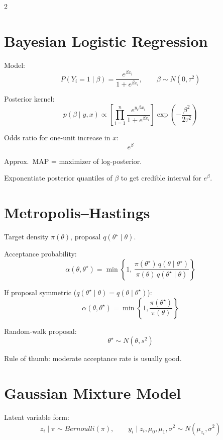 \documentclass[10pt]{article}
\begin{document}
\begin{multicols}{2}
\section{Bayesian Logistic Regression}

Model:
\[
P(Y_i=1\mid \beta)=\frac{e^{\beta x_i}}{1+e^{\beta x_i}},
\qquad
\beta\sim N(0,\tau^2)
\]

\begin{formulabox}
Posterior kernel:
\[
p(\beta\mid y,x)\propto
\left[
\prod_{i=1}^n
\frac{e^{y_i\beta x_i}}{1+e^{\beta x_i}}
\right]
\exp\left(-\frac{\beta^2}{2\tau^2}\right)
\]
\end{formulabox}

Odds ratio for one-unit increase in \(x\):
\[
e^\beta
\]

Approx.\ MAP = maximizer of log-posterior.

Exponentiate posterior quantiles of \(\beta\) to get credible interval for \(e^\beta\).

\section{Metropolis--Hastings}

Target density \(\pi(\theta)\), proposal \(q(\theta^\star\mid \theta)\).

\begin{formulabox}
Acceptance probability:
\[
\alpha(\theta,\theta^\star)=
\min\left\{
1,\,
\frac{\pi(\theta^\star)\,q(\theta\mid\theta^\star)}
{\pi(\theta)\,q(\theta^\star\mid\theta)}
\right\}
\]
\end{formulabox}

If proposal symmetric (\(q(\theta^\star\mid\theta)=q(\theta\mid\theta^\star)\)):
\[
\alpha(\theta,\theta^\star)=
\min\left\{1,\frac{\pi(\theta^\star)}{\pi(\theta)}\right\}
\]

Random-walk proposal:
\[
\theta^\star\sim N(\theta,s^2)
\]

Rule of thumb: moderate acceptance rate is usually good.

\section{Gaussian Mixture Model}

Latent variable form:
\[
z_i\mid \pi \sim Bernoulli(\pi),
\qquad
y_i\mid z_i,\mu_0,\mu_1,\sigma^2 \sim N(\mu_{z_i},\sigma^2)
\]


\end{multicols}
\end{document}
